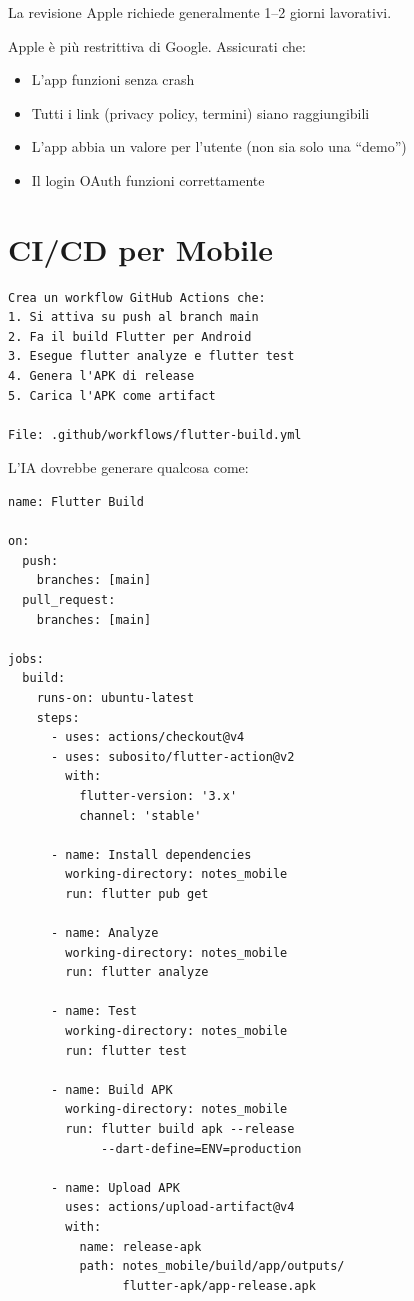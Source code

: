La revisione Apple richiede generalmente 1--2 giorni lavorativi.

\begin{warnbox}
Apple è più restrittiva di Google. Assicurati che:
\begin{itemize}
  \item L'app funzioni senza crash
  \item Tutti i link (privacy policy, termini) siano raggiungibili
  \item L'app abbia un valore per l'utente (non sia solo una ``demo'')
  \item Il login OAuth funzioni correttamente
\end{itemize}
\end{warnbox}

\section{CI/CD per Mobile}

\begin{praticabox}[title={Pratica --- GitHub Actions per build automatiche}]
\begin{lstlisting}[language={}]
Crea un workflow GitHub Actions che:
1. Si attiva su push al branch main
2. Fa il build Flutter per Android
3. Esegue flutter analyze e flutter test
4. Genera l'APK di release
5. Carica l'APK come artifact

File: .github/workflows/flutter-build.yml
\end{lstlisting}
\end{praticabox}

L'IA dovrebbe generare qualcosa come:

\begin{lstlisting}[language={},title={flutter-build.yml}]
name: Flutter Build

on:
  push:
    branches: [main]
  pull_request:
    branches: [main]

jobs:
  build:
    runs-on: ubuntu-latest
    steps:
      - uses: actions/checkout@v4
      - uses: subosito/flutter-action@v2
        with:
          flutter-version: '3.x'
          channel: 'stable'
      
      - name: Install dependencies
        working-directory: notes_mobile
        run: flutter pub get
      
      - name: Analyze
        working-directory: notes_mobile
        run: flutter analyze
      
      - name: Test
        working-directory: notes_mobile
        run: flutter test
      
      - name: Build APK
        working-directory: notes_mobile
        run: flutter build apk --release
             --dart-define=ENV=production
      
      - name: Upload APK
        uses: actions/upload-artifact@v4
        with:
          name: release-apk
          path: notes_mobile/build/app/outputs/
                flutter-apk/app-release.apk
\end{lstlisting}

